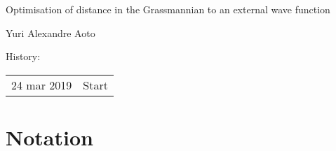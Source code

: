 \documentclass[a4paper,11pt]{article}
\begin{document}
\begin{center}
  {\LARGE Optimisation of distance in the Grassmannian to an external wave function}\vspace{1.0cm}

  {\Large Yuri Alexandre Aoto}
\end{center}
{History:
  
  \begin{tabular}{l@{ - }l}
    24 mar 2019 & Start\\
  \end{tabular}
}\vspace{3cm}


\section{Notation}
\end{document}
